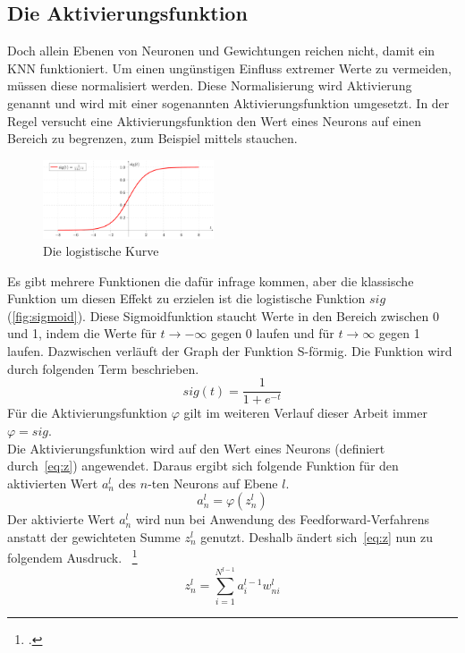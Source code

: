 \subsection{Die Aktivierungsfunktion}\label{subsec:aktivierung}
Doch allein Ebenen von Neuronen und Gewichtungen reichen nicht, damit ein KNN funktioniert.
Um einen ungünstigen Einfluss extremer Werte zu vermeiden, müssen diese normalisiert werden.
Diese Normalisierung wird Aktivierung genannt und wird mit einer sogenannten Aktivierungsfunktion umgesetzt.
In der Regel versucht eine Aktivierungsfunktion den Wert eines Neurons auf einen Bereich zu begrenzen, zum Beispiel mittels stauchen.
\begin{figure}
    \includegraphics[width=0.45\textwidth]{grafiken/sigmoid}
    \caption[Die logistische Kurve: \textit{Von Martin Thoma, CC0}]{Die logistische Kurve}
    \label{fig:sigmoid}
\end{figure}
Es gibt mehrere Funktionen die dafür infrage kommen, aber die klassische Funktion um diesen Effekt zu erzielen ist die logistische Funktion $sig$ (\autoref{fig:sigmoid}).
Diese Sigmoidfunktion staucht Werte in den Bereich zwischen 0 und 1, indem die Werte für $t \to -\infty$ gegen 0 laufen und für $t \to \infty$ gegen 1 laufen.
Dazwischen verläuft der Graph der Funktion S-förmig.
Die Funktion wird durch folgenden Term beschrieben.
\begin{equation*}
    sig(t) = \frac{1}{1+e^{-t}}
\end{equation*}
Für die Aktivierungsfunktion $\varphi$ gilt im weiteren Verlauf dieser Arbeit immer $\varphi = sig$.\\
Die Aktivierungsfunktion wird auf den Wert eines Neurons (definiert durch~\eqref{eq:z}) angewendet.
Daraus ergibt sich folgende Funktion für den aktivierten Wert $a^l_n$ des $n$-ten Neurons auf Ebene $l$.
\begin{equation}
    a^l_n = \varphi(z^l_n)
    \label{eq:a}
\end{equation}
Der aktivierte Wert $a^l_n$ wird nun bei Anwendung des Feedforward-Verfahrens anstatt der gewichteten Summe $z^l_n$ genutzt.
Deshalb ändert sich~\eqref{eq:z} nun zu folgendem Ausdruck.
~\footcite{3b1b-1}
\begin{equation}
    z^l_n = \sum\limits^{N^{l-1}}_{i=1} a^{l-1}_i w^l_{n i}
    \label{eq:z-mit-a}
\end{equation}


